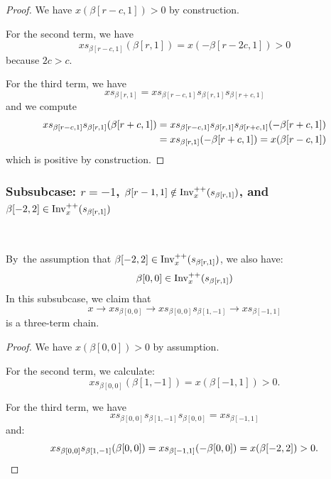 \documentclass[10pt]{amsart}
\begin{document}
\begin{proof}
We have $x(\beta[r-c,1]) > 0$ by construction.

For the second term, we have
\begin{equation}\label{eq:68}
x s_{\beta[r-c,1]} (\beta[r,1]) = x (- \beta[r-2c,1]) >0
\end{equation}
because $2c > c$.

For the third term, we have
\begin{equation}\label{eq:69}
x s_{\beta[r,1]} = x s_{\beta[r-c,1]} s_{\beta[r,1]} s_{\beta[r+c,1]}
\end{equation}
and we compute
\begin{align}\label{eq:70}
x s_{\beta[r-c,1]} s_{\beta[r,1]} (\beta[r+c,1]) &= x s_{\beta[r-c,1]} s_{\beta[r,1]} s_{\beta[r+c,1]} (-\beta[r+c,1])\\
&= x s_{\beta[r,1]}(-\beta[r+c,1]) = x(\beta[r-c,1]) \notag
\end{align}
which is positive by construction.
\end{proof}

\subsubsection*{Subsubcase: $r=-1$, $\beta[r-1,1] \notin \operatorname{Inv}^{++}_x(s_{\beta[r,1]})$, and $\beta[-2,2] \in \operatorname{Inv}^{++}_x(s_{\beta[r,1]})$}\ 

By~the assumption that $\beta[-2,2] \in \operatorname{Inv}^{++}_x(s_{\beta[r,1]})$, we also have:
\begin{equation}\label{eq:71}
\beta[0,0] \in \Invplusplusx(s_{\beta[r,1]})
\end{equation}
In this subsubcase, we claim that
\begin{equation}\label{eq:72}
x \rightarrow x s_{\beta[0,0]} \rightarrow x s_{\beta[0,0]} s_{\beta[1,-1]} \rightarrow x s_{\beta[-1,1]}
\end{equation}
is a three-term chain.

\begin{proof}
We have $x(\beta[0,0]) > 0$ by assumption.

For the second term, we calculate:
\begin{equation}\label{eq:73}
x s_{\beta[0,0]} (\beta[1,-1]) = x(\beta[-1,1]) > 0.
\end{equation}

For the third term, we have
\begin{equation}\label{eq:75}
x s_{\beta[0,0]} s_{\beta[1,-1]} s_{\beta[0,0]} = x s_{\beta[-1,1]}
\end{equation}
and:
\begin{equation}\label{eq:76}
x s_{\beta[0,0]} s_{\beta[1,-1]} (\beta[0,0]) = x s_{\beta[-1,1]}(- \beta[0,0]) = x (\beta[-2,2]) > 0.\qedhere
\end{equation}
\end{proof}
\end{document}
